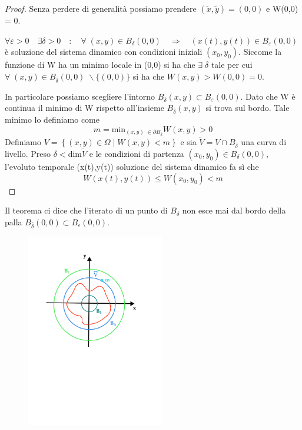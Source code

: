 \begin{proof}
	Senza perdere di generalit\`{a} possiamo prendere $(\tilde{x},\tilde{y})=(0,0)$ e W(0,0) = 0. \newline
	
	$\forall \varepsilon > 0 \quad \exists \delta > 0 \quad : \quad \forall \;(x,y) \in B_{\delta}(0,0) \quad \Rightarrow \quad (x(t),y(t)) \in B_{\varepsilon}(0,0)$ \`{e} soluzione del sistema dinamico con condizioni iniziali $(x_0,y_0)$. Siccome la funzione di W ha un minimo locale in (0,0) si ha che $\exists \; \bar{\delta}$ tale per cui $\forall \; (x,y) \in B_{\bar{\delta}}(0,0) \; \backslash \{(0,0)\}$ si ha che $W(x,y) > W(0,0) = 0$.
	\newline
	
	\noindent In particolare possiamo scegliere l'intorno $B_{\bar{\delta}}(x,y) \subset B_{\varepsilon}(0,0)$. Dato che W \`{e} continua il minimo di W rispetto all'insieme $B_{\bar{\delta}}(x,y)$ si trova sul bordo. Tale minimo lo definiamo come
	\begin{equation*}
		m = \text{min}_{(x,y) \; \in \partial B_{\bar{\delta}}} W(x,y) > 0 
	\end{equation*} 
Definiamo $V = \left \{ (x,y) \in \Omega \; | \; W(x,y)< m \right \}$ e sia $\tilde{V} = V \cap B_{\bar{\delta}}$ una curva di livello. Preso $\delta < \text{dim}\tilde{V}$ e le condizioni di partenza $(x_0,y_0) \in B_{\delta}(0,0)$, l'evoluto temporale (x(t),y(t)) soluzione del sistema dinamico fa s\`{i} che 
\begin{equation*}
	W(x(t),y(t)) \leq W(x_0,y_0) < m
\end{equation*}

\end{proof}
Il teorema ci dice che l'iterato di un punto di $B_{\delta}$ non esce mai dal bordo della palla $B_{\bar{\delta}}(0,0) \subset B_{\varepsilon}(0,0)$.
 
\begin{figure}[!ht]
\vspace{0.1in}
\includegraphics[width = 6cm]{lyap}	
\centering
\end{figure}


